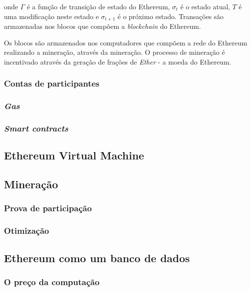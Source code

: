 \documentclass[tcc,capa]{texufpel}
\begin{document}
	    onde $\Gamma$ é a função de transição de estado do Ethereum, $\sigma_t$ é o estado atual, $T$ é uma modificação neste estado e $\sigma_{t+1}$ é o próximo estado. Transações são armazenadas nos blocos que compõem a \textit{blockchain} do Ethereum. 
	    
	    Os blocos são armazenados nos computadores que compõem a rede do Ethereum realizando a mineração, através da mineração. O processo de mineração é incentivado através da geração de frações de \textit{Ether} - a moeda do Ethereum.
    
    	\subsubsection{Contas de participantes}
    
    	\subsubsection{\textit{Gas}}
        
        \subsubsection{\textit{Smart contracts}}

	\subsection{Ethereum Virtual Machine}
    
    \subsection{Mineração}
    
    	\subsubsection{Prova de participação}
        
        \subsubsection{Otimização}
    
    \subsection{Ethereum como um banco de dados}
    
    	\subsubsection{O preço da computação}
\end{document}
